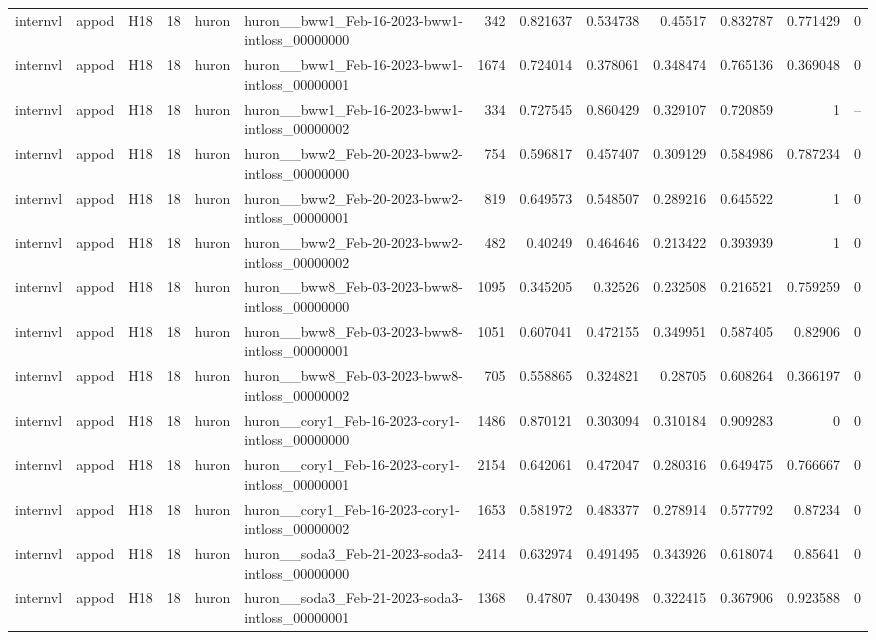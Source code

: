 \begin{longtable}{lllrllrrrrrrr}
internvl & appod & H18 & 18 & huron & huron\_\_bww1\_Feb-16-2023-bww1-intloss\_00000000 & 342 & 0.821637 & 0.534738 & 0.45517 & 0.832787 & 0.771429 & 0 \\
internvl & appod & H18 & 18 & huron & huron\_\_bww1\_Feb-16-2023-bww1-intloss\_00000001 & 1674 & 0.724014 & 0.378061 & 0.348474 & 0.765136 & 0.369048 & 0 \\
internvl & appod & H18 & 18 & huron & huron\_\_bww1\_Feb-16-2023-bww1-intloss\_00000002 & 334 & 0.727545 & 0.860429 & 0.329107 & 0.720859 & 1 & -- \\
internvl & appod & H18 & 18 & huron & huron\_\_bww2\_Feb-20-2023-bww2-intloss\_00000000 & 754 & 0.596817 & 0.457407 & 0.309129 & 0.584986 & 0.787234 & 0 \\
internvl & appod & H18 & 18 & huron & huron\_\_bww2\_Feb-20-2023-bww2-intloss\_00000001 & 819 & 0.649573 & 0.548507 & 0.289216 & 0.645522 & 1 & 0 \\
internvl & appod & H18 & 18 & huron & huron\_\_bww2\_Feb-20-2023-bww2-intloss\_00000002 & 482 & 0.40249 & 0.464646 & 0.213422 & 0.393939 & 1 & 0 \\
internvl & appod & H18 & 18 & huron & huron\_\_bww8\_Feb-03-2023-bww8-intloss\_00000000 & 1095 & 0.345205 & 0.32526 & 0.232508 & 0.216521 & 0.759259 & 0 \\
internvl & appod & H18 & 18 & huron & huron\_\_bww8\_Feb-03-2023-bww8-intloss\_00000001 & 1051 & 0.607041 & 0.472155 & 0.349951 & 0.587405 & 0.82906 & 0 \\
internvl & appod & H18 & 18 & huron & huron\_\_bww8\_Feb-03-2023-bww8-intloss\_00000002 & 705 & 0.558865 & 0.324821 & 0.28705 & 0.608264 & 0.366197 & 0 \\
internvl & appod & H18 & 18 & huron & huron\_\_cory1\_Feb-16-2023-cory1-intloss\_00000000 & 1486 & 0.870121 & 0.303094 & 0.310184 & 0.909283 & 0 & 0 \\
internvl & appod & H18 & 18 & huron & huron\_\_cory1\_Feb-16-2023-cory1-intloss\_00000001 & 2154 & 0.642061 & 0.472047 & 0.280316 & 0.649475 & 0.766667 & 0 \\
internvl & appod & H18 & 18 & huron & huron\_\_cory1\_Feb-16-2023-cory1-intloss\_00000002 & 1653 & 0.581972 & 0.483377 & 0.278914 & 0.577792 & 0.87234 & 0 \\
internvl & appod & H18 & 18 & huron & huron\_\_soda3\_Feb-21-2023-soda3-intloss\_00000000 & 2414 & 0.632974 & 0.491495 & 0.343926 & 0.618074 & 0.85641 & 0 \\
internvl & appod & H18 & 18 & huron & huron\_\_soda3\_Feb-21-2023-soda3-intloss\_00000001 & 1368 & 0.47807 & 0.430498 & 0.322415 & 0.367906 & 0.923588 & 0 \\

\end{longtable}
